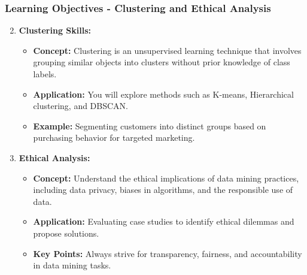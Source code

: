 \documentclass{beamer}
\begin{document}
\begin{frame}[fragile]
    \frametitle{Learning Objectives - Clustering and Ethical Analysis}
    \begin{enumerate}
        \setcounter{enumi}{1}
        \item \textbf{Clustering Skills:}
        \begin{itemize}
            \item \textbf{Concept:} Clustering is an unsupervised learning technique that involves grouping similar objects into clusters without prior knowledge of class labels.
            \item \textbf{Application:} You will explore methods such as K-means, Hierarchical clustering, and DBSCAN.
            \item \textbf{Example:} Segmenting customers into distinct groups based on purchasing behavior for targeted marketing.
        \end{itemize}

        \item \textbf{Ethical Analysis:}
        \begin{itemize}
            \item \textbf{Concept:} Understand the ethical implications of data mining practices, including data privacy, biases in algorithms, and the responsible use of data.
            \item \textbf{Application:} Evaluating case studies to identify ethical dilemmas and propose solutions.
            \item \textbf{Key Points:} Always strive for transparency, fairness, and accountability in data mining tasks.
        \end{itemize}
    \end{enumerate}
\end{frame}
\end{document}
